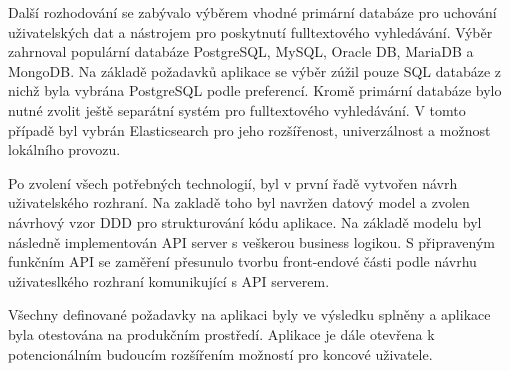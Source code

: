 Další rozhodování se zabývalo výběrem vhodné primární databáze pro uchování uživatelských dat a nástrojem pro
poskytnutí fulltextového vyhledávání.
Výběr zahrnoval populární databáze PostgreSQL, MySQL, Oracle DB, MariaDB a MongoDB.
Na základě požadavků aplikace se výběr zúžil pouze \ac{SQL} databáze z nichž byla vybrána PostgreSQL podle preferencí.
Kromě primární databáze bylo nutné zvolit ještě separátní systém pro fulltextového vyhledávání.
V tomto případě byl vybrán Elasticsearch pro jeho rozšířenost, univerzálnost a možnost lokálního provozu.

Po zvolení všech potřebných technologií, byl v první řadě vytvořen návrh uživatelského rozhraní.
Na zakladě toho byl navržen datový model a zvolen návrhový vzor \ac{DDD} pro strukturování
kódu aplikace.
Na základě modelu byl následně implementován \ac{API} server s veškerou business logikou.
S připraveným funkčním \ac{API} se zaměření přesunulo tvorbu front-endové části podle návrhu uživateslkého rozhraní
komunikující s \ac{API} serverem.

Všechny definované požadavky na aplikaci byly ve výsledku splněny a aplikace byla otestována na produkčním prostředí.
Aplikace je dále otevřena k potencionálním budoucím rozšířením možností pro koncové uživatele.

